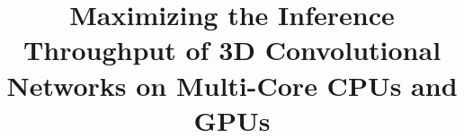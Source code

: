 \documentclass[conference]{./IEEEtran/IEEEtran}
\begin{document}



\title{Maximizing the Inference Throughput of 3D Convolutional
  Networks on Multi-Core CPUs and GPUs}



\maketitle

\end{document}
